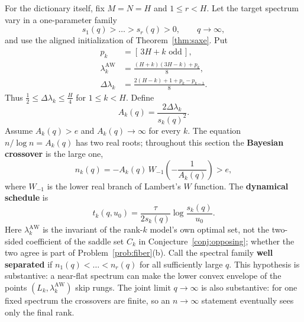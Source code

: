 \documentclass[11pt]{amsart}
\theoremstyle{plain}
\theoremstyle{definition}
\begin{document}
For the dictionary itself, fix $M=N=H$ and $1\le r<H$. Let the target spectrum vary in a one-parameter family
\[
   s_1(q)>\dots>s_r(q)>0,\qquad q\to\infty,
\]
and use the aligned initialization of Theorem~\ref{thm:saxe}. Put
\[
   \begin{aligned}
   p_k&=[\,3H+k\text{ odd}\,],\\
   \lambda_k^{\mathrm{AW}}
   &=\frac{(H+k)(3H-k)+p_k}{8},\\
   \Delta\lambda_k
   &=\frac{2(H-k)+1+p_k-p_{k-1}}{8}.
   \end{aligned}
\]
Thus $\tfrac12\le\Delta\lambda_k\le\tfrac H4$ for $1\le k<H$. Define
\[
   A_k(q)=\frac{2\Delta\lambda_k}{s_k(q)^2}.
\]
Assume $A_k(q)>e$ and $A_k(q)\to\infty$ for every $k$. The equation $n/\log n=A_k(q)$ has two real roots; throughout this section the \textbf{Bayesian crossover} is the large one,
\[
   n_k(q)
   =-A_k(q)\,W_{-1}\!\left(-\frac1{A_k(q)}\right)>e,
\]
where $W_{-1}$ is the lower real branch of Lambert's $W$ function. The \textbf{dynamical schedule} is
\[
   t_k(q,u_0)
   =\frac{\tau}{2s_k(q)}\log\frac{s_k(q)}{u_0}.
\]
Here $\lambda_k^{\mathrm{AW}}$ is the invariant of the rank-$k$ model's own optimal set, not the two-sided coefficient of the saddle set $C_k$ in Conjecture~\ref{conj:opposing}; whether the two agree is part of Problem~\ref{prob:fiber}(b). Call the spectral family \textbf{well separated} if $n_1(q)<\dots<n_r(q)$ for all sufficiently large $q$. This hypothesis is substantive: a near-flat spectrum can make the lower convex envelope of the points $(L_k,\lambda_k^{\mathrm{AW}})$ skip rungs. The joint limit $q\to\infty$ is also substantive: for one fixed spectrum the crossovers are finite, so an $n\to\infty$ statement eventually sees only the final rank.
\end{document}
